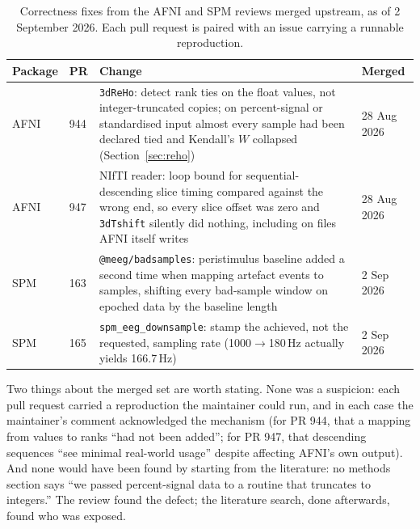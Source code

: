 \documentclass[11pt]{article}
\newcommand{\code}[1]{\texttt{#1}}
\begin{document}
\begin{table}[t]
\centering\small
\caption{Correctness fixes from the AFNI and SPM reviews merged upstream, as of 2 September 2026. Each pull request is paired with an issue carrying a runnable reproduction.}
\label{tab:merged}
\begin{tabular}{@{}llp{8.6cm}l@{}}
\toprule
Package & PR & Change & Merged \\
\midrule
AFNI & 944 & \code{3dReHo}: detect rank ties on the float values, not integer-truncated copies; on percent-signal or standardised input almost every sample had been declared tied and Kendall's $W$ collapsed (Section~\ref{sec:reho}) & 28 Aug 2026 \\
AFNI & 947 & NIfTI reader: loop bound for sequential-descending slice timing compared against the wrong end, so every slice offset was zero and \code{3dTshift} silently did nothing, including on files AFNI itself writes & 28 Aug 2026 \\
SPM & 163 & \code{@meeg/badsamples}: peristimulus baseline added a second time when mapping artefact events to samples, shifting every bad-sample window on epoched data by the baseline length & 2 Sep 2026 \\
SPM & 165 & \code{spm\_eeg\_downsample}: stamp the achieved, not the requested, sampling rate (1000$\to$180\,Hz actually yields 166.7\,Hz) & 2 Sep 2026 \\
\bottomrule
\end{tabular}
\end{table}

Two things about the merged set are worth stating. None was a suspicion: each pull request carried a reproduction the maintainer could run, and in each case the maintainer's comment acknowledged the mechanism (for PR 944, that a mapping from values to ranks ``had not been added''; for PR 947, that descending sequences ``see minimal real-world usage'' despite affecting AFNI's own output). And none would have been found by starting from the literature: no methods section says ``we passed percent-signal data to a routine that truncates to integers.'' The review found the defect; the literature search, done afterwards, found who was exposed.
\end{document}
